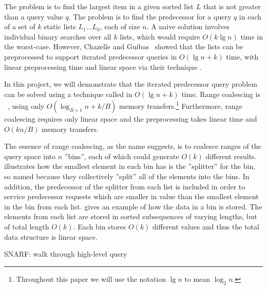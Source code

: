 
The  problem is to find the largest item in a given sorted list $L$
that is not greater than a query value $q$.  The  
problem is to find the predecessor for a query $q$ in each of a set of $k$ static lists
$L_1 \ldots L_k$, each of size $n$.  A naive solution involves individual binary searches over all
$k$ lists, which would require $O(k \lg n)$ time in the worst-case.  However, Chazelle
and Guibas~\cite{ChazelleGu86a} showed that the lists can be 
preprocessed to support iterated predecessor queries in $O(\lg n + k)$ time, with
linear preprocessing time and linear space via their technique .

In this project, we will demonstrate that the iterated predecessor query problem
can be solved using a technique called  in $O(\lg n + k)$ time.
Range coalescing is ~\cite{FrigoLePr99}, using only 
$O(\log_{B+1} n + k/B)$ memory transfers.\footnote{Throughout this paper we will 
use the notation $\lg n$ to mean $\log_2 n$.}  Furthermore, range coalescing requires
only linear space and the preprocessing takes linear time and $O(kn/B)$ memory
transfers.

The essence of range coalescing, as the name suggests, is to coalesce ranges of 
the query space into $n$ ''bins'', each of which could generate $O(k)$ different results.
 illustrates how the smallest element in each bin has 
is the ''splitter'' for the bin, so named because they collectively ''split'' all
of the elements into the bins.  In addition,
the predecessor of the splitter from each list is included in order to
service predecessor requests which are smaller in value than the smallest element
in the bin from each list.   gives an example of how the data
in a bin is stored.  The elements from each list are stored in sorted subsequences of
varying lengths, but of total length $O(k)$. Each bin stores $O(k)$ different 
values and thus the total data structure is linear space.

SNARF: walk through high-level query

